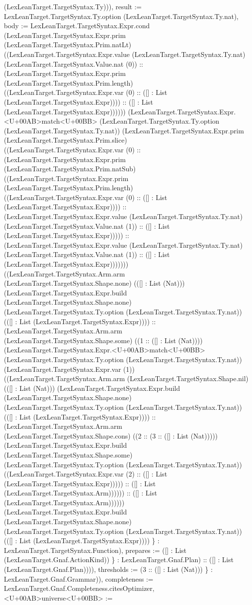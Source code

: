 \documentclass[11pt]{article}
\begin{document}
(LexLeanTarget.TargetSyntax.Ty))), result := LexLeanTarget.TargetSyntax.Ty.option (LexLeanTarget.TargetSyntax.Ty.nat), body := LexLeanTarget.TargetSyntax.Expr.cond (LexLeanTarget.TargetSyntax.Expr.prim (LexLeanTarget.TargetSyntax.Prim.natLt) ((LexLeanTarget.TargetSyntax.Expr.value (LexLeanTarget.TargetSyntax.Ty.nat) (LexLeanTarget.TargetSyntax.Value.nat (0)) :: (LexLeanTarget.TargetSyntax.Expr.prim (LexLeanTarget.TargetSyntax.Prim.length) ((LexLeanTarget.TargetSyntax.Expr.var (0) :: ([] : List (LexLeanTarget.TargetSyntax.Expr)))) :: ([] : List (LexLeanTarget.TargetSyntax.Expr)))))) (LexLeanTarget.TargetSyntax.Expr.<U+00AB>match<U+00BB> (LexLeanTarget.TargetSyntax.Ty.option (LexLeanTarget.TargetSyntax.Ty.nat)) (LexLeanTarget.TargetSyntax.Expr.prim (LexLeanTarget.TargetSyntax.Prim.slice) ((LexLeanTarget.TargetSyntax.Expr.var (0) :: (LexLeanTarget.TargetSyntax.Expr.prim (LexLeanTarget.TargetSyntax.Prim.natSub) ((LexLeanTarget.TargetSyntax.Expr.prim (LexLeanTarget.TargetSyntax.Prim.length) ((LexLeanTarget.TargetSyntax.Expr.var (0) :: ([] : List (LexLeanTarget.TargetSyntax.Expr)))) :: (LexLeanTarget.TargetSyntax.Expr.value (LexLeanTarget.TargetSyntax.Ty.nat) (LexLeanTarget.TargetSyntax.Value.nat (1)) :: ([] : List (LexLeanTarget.TargetSyntax.Expr))))) :: (LexLeanTarget.TargetSyntax.Expr.value (LexLeanTarget.TargetSyntax.Ty.nat) (LexLeanTarget.TargetSyntax.Value.nat (1)) :: ([] : List (LexLeanTarget.TargetSyntax.Expr))))))) ((LexLeanTarget.TargetSyntax.Arm.arm (LexLeanTarget.TargetSyntax.Shape.none) (([] : List (Nat))) (LexLeanTarget.TargetSyntax.Expr.build (LexLeanTarget.TargetSyntax.Shape.none) (LexLeanTarget.TargetSyntax.Ty.option (LexLeanTarget.TargetSyntax.Ty.nat)) (([] : List (LexLeanTarget.TargetSyntax.Expr)))) :: (LexLeanTarget.TargetSyntax.Arm.arm (LexLeanTarget.TargetSyntax.Shape.some) ((1 :: ([] : List (Nat)))) (LexLeanTarget.TargetSyntax.Expr.<U+00AB>match<U+00BB> (LexLeanTarget.TargetSyntax.Ty.option (LexLeanTarget.TargetSyntax.Ty.nat)) (LexLeanTarget.TargetSyntax.Expr.var (1)) ((LexLeanTarget.TargetSyntax.Arm.arm (LexLeanTarget.TargetSyntax.Shape.nil) (([] : List (Nat))) (LexLeanTarget.TargetSyntax.Expr.build (LexLeanTarget.TargetSyntax.Shape.none) (LexLeanTarget.TargetSyntax.Ty.option (LexLeanTarget.TargetSyntax.Ty.nat)) (([] : List (LexLeanTarget.TargetSyntax.Expr)))) :: (LexLeanTarget.TargetSyntax.Arm.arm (LexLeanTarget.TargetSyntax.Shape.cons) ((2 :: (3 :: ([] : List (Nat))))) (LexLeanTarget.TargetSyntax.Expr.build (LexLeanTarget.TargetSyntax.Shape.some) (LexLeanTarget.TargetSyntax.Ty.option (LexLeanTarget.TargetSyntax.Ty.nat)) ((LexLeanTarget.TargetSyntax.Expr.var (2) :: ([] : List (LexLeanTarget.TargetSyntax.Expr))))) :: ([] : List (LexLeanTarget.TargetSyntax.Arm)))))) :: ([] : List (LexLeanTarget.TargetSyntax.Arm)))))) (LexLeanTarget.TargetSyntax.Expr.build (LexLeanTarget.TargetSyntax.Shape.none) (LexLeanTarget.TargetSyntax.Ty.option (LexLeanTarget.TargetSyntax.Ty.nat)) (([] : List (LexLeanTarget.TargetSyntax.Expr)))) \} : LexLeanTarget.TargetSyntax.Function), prepares := ([] : List (LexLeanTarget.Gnaf.ActionKind)) \} : LexLeanTarget.Gnaf.Plan) :: ([] : List (LexLeanTarget.Gnaf.Plan)))), thresholds := (3 :: ([] : List (Nat))) \} : LexLeanTarget.Gnaf.Grammar)), completeness := LexLeanTarget.Gnaf.Completeness.citesOptimizer, <U+00AB>universe<U+00BB> := 
\end{document}
